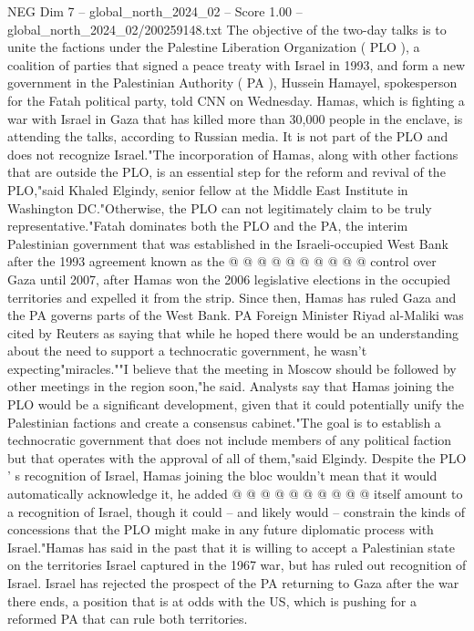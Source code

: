 \begin{textsample}{NEG Dim 7 – global\_north\_2024\_02 – Score 1.00 – global\_north\_2024\_02/200259148.txt}  \label{ex:f7_neg_432}
The objective of the two-day talks is to unite the factions under the Palestine Liberation Organization ( PLO ), a coalition of parties that signed a peace treaty with Israel in 1993, and form a new government in the Palestinian Authority ( PA ), Hussein Hamayel, spokesperson for the Fatah political party, told CNN on Wednesday.
Hamas, which is fighting a war with Israel in Gaza that has killed more than 30,000 people in the enclave, is attending the talks, according to Russian media.
It is not part of the PLO and does not recognize Israel."The incorporation of Hamas, along with other factions that are outside the PLO, is an essential step for the reform and revival of the PLO,"said Khaled Elgindy, senior fellow at the Middle East Institute in Washington DC."Otherwise, the PLO can not legitimately claim to be truly representative."Fatah dominates both the PLO and the PA, the interim Palestinian government that was established in the Israeli-occupied West Bank after the 1993 agreement known as the @ @ @ @ @ @ @ @ @ @ control over Gaza until 2007, after Hamas won the 2006 legislative elections in the occupied territories and expelled it from the strip.
Since then, Hamas has ruled Gaza and the PA governs parts of the West Bank.
PA Foreign Minister Riyad al-Maliki was cited by Reuters as saying that while he hoped there would be an understanding about the need to support a technocratic government, he wasn't expecting"miracles.""I believe that the meeting in Moscow should be followed by other meetings in the region soon,"he said.
Analysts say that Hamas joining the PLO would be a significant development, given that it could potentially unify the Palestinian factions and create a consensus cabinet."The goal is to establish a technocratic government that does not include members of any political faction but that operates with the approval of all of them,"said Elgindy.
Despite the PLO ' s recognition of Israel, Hamas joining the bloc wouldn't mean that it would automatically acknowledge it, he added @ @ @ @ @ @ @ @ @ @ itself amount to a recognition of Israel, though it could -- and likely would -- constrain the kinds of concessions that the PLO might make in any future diplomatic process with Israel."Hamas has said in the past that it is willing to accept a Palestinian state on the territories Israel captured in the 1967 war, but has ruled out recognition of Israel.
Israel has rejected the prospect of the PA returning to Gaza after the war there ends, a position that is at odds with the US, which is pushing for a reformed PA that can rule both territories.

\end{textsample}
